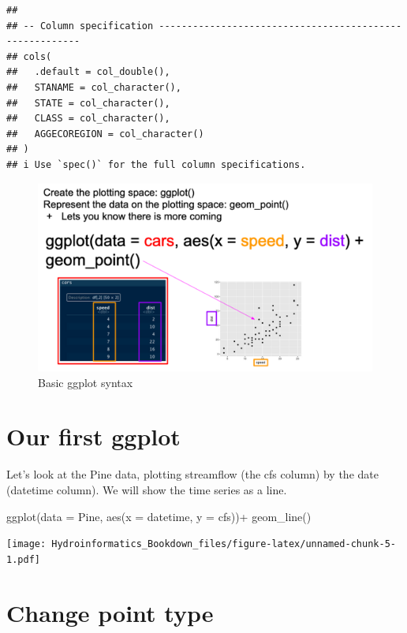 \documentclass[
]{book}
\newenvironment{Shaded}{\begin{snugshade}}{\end{snugshade}}
\newcommand{\AttributeTok}[1]{\textcolor[rgb]{0.77,0.63,0.00}{#1}}
\newcommand{\FunctionTok}[1]{\textcolor[rgb]{0.00,0.00,0.00}{#1}}
\newcommand{\NormalTok}[1]{#1}
\newcommand{\SpecialCharTok}[1]{\textcolor[rgb]{0.00,0.00,0.00}{#1}}
\begin{document}
\begin{verbatim}
## 
## -- Column specification --------------------------------------------------------
## cols(
##   .default = col_double(),
##   STANAME = col_character(),
##   STATE = col_character(),
##   CLASS = col_character(),
##   AGGECOREGION = col_character()
## )
## i Use `spec()` for the full column specifications.
\end{verbatim}

\begin{figure}
\centering
\includegraphics{images/GGplot syntax.png}
\caption{Basic ggplot syntax}
\end{figure}

\hypertarget{our-first-ggplot}{%
\section{Our first ggplot}\label{our-first-ggplot}}

Let's look at the Pine data, plotting streamflow (the cfs column) by the date (datetime column). We will show the time series as a line.

\begin{Shaded}
\begin{Highlighting}[]
\FunctionTok{ggplot}\NormalTok{(}\AttributeTok{data =}\NormalTok{ Pine, }\FunctionTok{aes}\NormalTok{(}\AttributeTok{x =}\NormalTok{ datetime, }\AttributeTok{y =}\NormalTok{ cfs))}\SpecialCharTok{+}
  \FunctionTok{geom\_line}\NormalTok{()}
\end{Highlighting}
\end{Shaded}

\texttt{[image: Hydroinformatics\_Bookdown\_files/figure-latex/unnamed-chunk-5-1.pdf]}

\hypertarget{change-point-type}{%
\section{Change point type}\label{change-point-type}}
\end{document}
